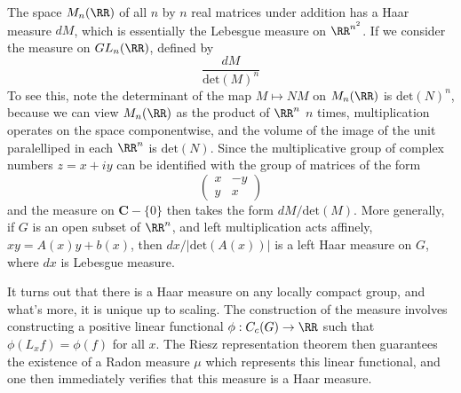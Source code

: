 \begin{example}
    The space $M_n(\RR)$ of all $n$ by $n$ real matrices under addition has a Haar measure $dM$, which is essentially the Lebesgue measure on $\RR^{n^2}$. If we consider the measure on $GL_n(\RR)$, defined by
    \[ \frac{dM}{\text{det}(M)^n} \]
    To see this, note the determinant of the map $M \mapsto NM$ on $M_n(\RR)$ is $\text{det}(N)^n$, because we can view $M_n(\RR)$ as the product of $\RR^n$ $n$ times, multiplication operates on the space componentwise, and the volume of the image of the unit paralelliped in each $\RR^n$ is $\text{det}(N)$. Since the multiplicative group of complex numbers $z = x + iy$ can be identified with the group of matrices of the form
    \[ \begin{pmatrix} x & -y \\ y & x \end{pmatrix} \]
    and the measure on $\mathbf{C} - \{ 0 \}$ then takes the form $dM/\text{det}(M)$. More generally, if $G$ is an open subset of $\RR^n$, and left multiplication acts affinely, $xy = A(x)y + b(x)$, then $dx/|\text{det}(A(x))|$ is a left Haar measure on $G$, where $dx$ is Lebesgue measure.
\end{example}

It turns out that there is a Haar measure on any locally compact group, and what's more, it is unique up to scaling. The construction of the measure involves constructing a positive linear functional $\phi: C_c(G) \to \RR$ such that $\phi(L_x f) = \phi(f)$ for all $x$. The Riesz representation theorem then guarantees the existence of a Radon measure $\mu$ which represents this linear functional, and one then immediately verifies that this measure is a Haar measure.

